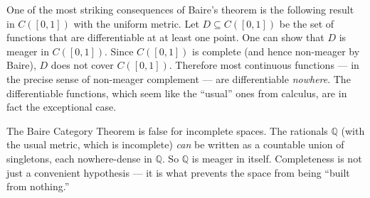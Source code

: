 \begin{remark*}
One of the most striking consequences of Baire's theorem is the
following result in $C([0,1])$ with the uniform metric.
Let $D \subseteq C([0,1])$ be the set of functions that are
differentiable at at least one point.
One can show that $D$ is meager in $C([0,1])$.
Since $C([0,1])$ is complete (and hence non-meager by Baire),
$D$ does not cover $C([0,1])$.
Therefore most continuous functions --- in the precise sense of
non-meager complement --- are differentiable \emph{nowhere}.
The differentiable functions, which seem like the ``usual'' ones
from calculus, are in fact the exceptional case.
\end{remark*}

\begin{remark*}
The Baire Category Theorem is false for incomplete spaces.
The rationals $\mathbb{Q}$ (with the usual metric, which is incomplete)
\emph{can} be written as a countable union of singletons, each
nowhere-dense in $\mathbb{Q}$.
So $\mathbb{Q}$ is meager in itself.
Completeness is not just a convenient hypothesis --- it is what prevents
the space from being ``built from nothing.''
\end{remark*}

